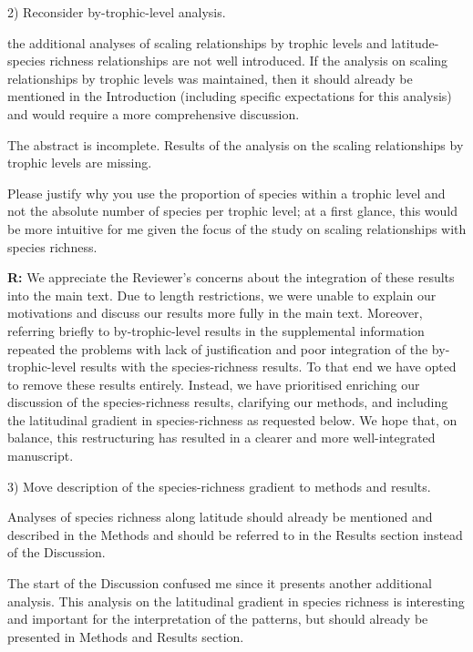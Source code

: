 \documentclass[12pt]{letter}
\newenvironment{refquote}{\bigskip \begin{it}}{\end{it}\smallskip}
\begin{document}
  2) Reconsider by-trophic-level analysis.

  \begin{refquote}

    the additional analyses of scaling relationships by trophic levels and
    latitude-species richness relationships are not well introduced. If the
    analysis on scaling relationships by trophic levels was maintained, then
    it should already be mentioned in the Introduction (including specific
    expectations for this analysis) and would require a more comprehensive
    discussion.

    \smallskip

    The abstract is incomplete. Results of the analysis on the scaling
    relationships by trophic levels are missing.

    \smallskip

    Please justify why you use the proportion of species within a trophic
    level and not the absolute number of species per trophic level; at a first
    glance, this would be more intuitive for me given the focus of the study
    on scaling relationships with species richness.

  \end{refquote}


  \textbf{R:} We appreciate the Reviewer's concerns about 
  the integration of these results into the main text. Due 
  to length restrictions, we were unable to explain our 
  motivations and discuss our results more fully in the main
  text. Moreover,
  referring briefly to by-trophic-level results in the supplemental
  information repeated the problems with lack of justification and
  poor integration of the by-trophic-level results with the 
  species-richness results. To that end we have opted to remove
  these results entirely. Instead, we have prioritised enriching
  our discussion of the species-richness results, clarifying our
  methods, and including the latitudinal gradient in species-richness
  as requested below. We hope that, on balance, this restructuring has
  resulted in a clearer and more well-integrated manuscript.


  3) Move description of the species-richness gradient to methods and results.


  \begin{refquote}

     Analyses of species richness along latitude should already be mentioned
     and described in the Methods and should be referred to in the Results
     section instead of the Discussion.

     \smallskip

      The start of the Discussion confused me since it presents another
      additional analysis. This analysis on the latitudinal gradient in
      species richness is interesting and important for the interpretation of
      the patterns, but should already be presented in Methods and Results
      section.

  \end{refquote}
\end{document}
